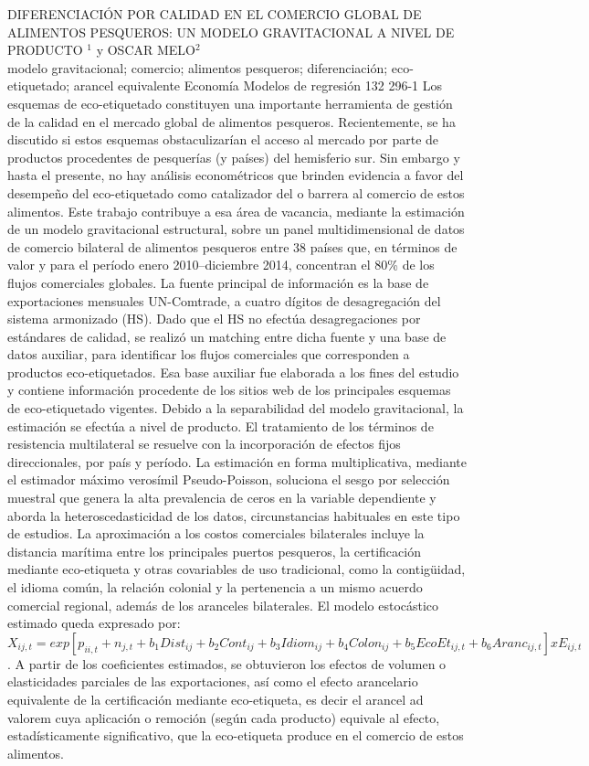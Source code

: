\A
{DIFERENCIACIÓN POR CALIDAD EN EL COMERCIO GLOBAL DE ALIMENTOS PESQUEROS: UN MODELO GRAVITACIONAL A NIVEL DE PRODUCTO}
{$^1$ y OSCAR MELO$^2$}
{
\\}
{modelo gravitacional; comercio; alimentos pesqueros; diferenciación; eco-etiquetado; arancel equivalente} 
 {Economía} 
 {Modelos de regresión} 
 {132} 
 {296-1}
{Los esquemas de eco-etiquetado constituyen una importante herramienta de gestión de la calidad en el mercado global de alimentos pesqueros. Recientemente, se ha discutido si estos esquemas obstaculizarían el acceso al mercado por parte de productos procedentes de pesquerías (y países) del hemisferio sur. Sin embargo y hasta el presente, no hay análisis econométricos que brinden evidencia a favor del desempeño del eco-etiquetado como catalizador del o barrera al comercio de estos alimentos. Este trabajo contribuye a esa área de vacancia, mediante la estimación de un modelo gravitacional estructural, sobre un panel multidimensional de datos de comercio bilateral de alimentos pesqueros entre 38 países que, en términos de valor y para el período enero 2010–diciembre 2014, concentran el 80\% de los flujos comerciales globales. La fuente principal de información es la base de exportaciones mensuales UN-Comtrade, a cuatro dígitos de desagregación del sistema armonizado (HS). Dado que el HS no efectúa desagregaciones por estándares de calidad, se realizó un matching entre dicha fuente y una base de datos auxiliar, para identificar los flujos comerciales que corresponden a productos eco-etiquetados. Esa base auxiliar fue elaborada a los fines del estudio y contiene información procedente de los sitios web de los principales esquemas de eco-etiquetado vigentes. Debido a la separabilidad del modelo gravitacional, la estimación se efectúa a nivel de producto. El tratamiento de los términos de resistencia multilateral se resuelve con la incorporación de efectos fijos direccionales, por país y período. La estimación en forma multiplicativa, mediante el estimador máximo verosímil Pseudo-Poisson, soluciona el sesgo por selección muestral que genera la alta prevalencia de ceros en la variable dependiente y aborda la heteroscedasticidad de los datos, circunstancias habituales en este tipo de estudios. La aproximación a los costos comerciales bilaterales incluye la distancia marítima entre los principales puertos pesqueros, la certificación mediante eco-etiqueta y otras covariables de uso tradicional, como la contigüidad, el idioma común, la relación colonial y la pertenencia a un mismo acuerdo comercial regional, además de los aranceles bilaterales. El modelo estocástico estimado queda expresado por: $X_{ij,t} = exp[p_{ii,t} + n_{j,t} + b_1 Dist_{ij} + b_2 Cont_{ij} + b_3 Idiom_{ij} + b_4 Colon_{ij} + b_5 EcoEt_{ij,t} + b_6 Aranc_{ij,t}] x E_{ij,t}$. A partir de los coeficientes estimados, se obtuvieron los efectos de volumen o elasticidades parciales de las exportaciones, así como el efecto arancelario equivalente de la certificación mediante eco-etiqueta, es decir el arancel ad valorem cuya aplicación o remoción (según cada producto) equivale al efecto, estadísticamente significativo, que la eco-etiqueta produce en el comercio de estos alimentos. }
